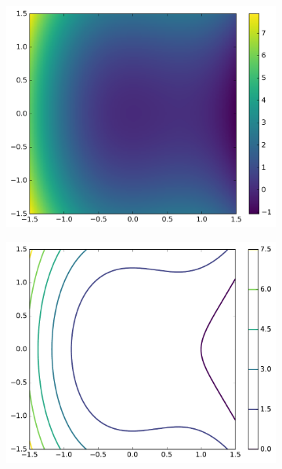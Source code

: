 \begin{figure}[H] %
\centering
\begin{subfigure}{.495\textwidth}
    \centering
    \includegraphics[width=\linewidth]{figures/heatmap_1.png}
\end{subfigure}
%
\begin{subfigure}{.495\textwidth}
    \centering
    \includegraphics[width=\linewidth]{figures/contour_1.pdf}
\end{subfigure}
\\
\begin{subfigure}{.495\textwidth}

\end{subfigure}
\end{figure}
